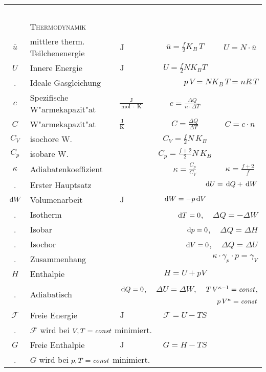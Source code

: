 \begin{landscape}
\begin{longtable}{c l l c c}
%
\hline
~ \\
%
%
%
~ & \textsc{Thermodynamik}\\
$\bar u$ & mittlere therm. Teilchenenergie & $\operatorname{J}$ &
$\bar u = \frac{f}{2} K_B \, T$ & $U = N \cdot \bar u$\\
$U$ & Innere Energie & $\operatorname{J}$ & $U = \frac{f}{2} N K_B
T$\\
. & Ideale Gasgleichung & \multicolumn{3}{r}{$p\,V = N K_B \,T = n R
  \, T$}\\
$c$ & Spezifische W"armekapazit"at &
$\frac{\operatorname{J}}{\operatorname{mol}\cdot \operatorname{K}}$ &
$c = \frac{\Delta Q}{n \cdot \Delta T}$\\
$C$ & W"armekapazit"at & $\frac{\operatorname{J}}{\operatorname{K}}$ &
$C = \frac{\Delta Q}{\Delta T}$ & $C = c \cdot n$\\
$C_V$ & isochore W. & ~ & $C_V = \frac{f}{2} N\, K_B$\\
$C_p$ & isobare W. & ~ & $C_p = \frac{f+2}{2} N\, K_B$\\
$\kappa$ & Adiabatenkoeffizient & ~ & $\kappa = \frac{C_p}{C_V}$ &
$\kappa = \frac{f+2}{f}$\\
. & Erster Hauptsatz & \multicolumn{3}{r}{$\, \mathrm{d} U = \, \mathrm{d} Q + \, \mathrm{d} W$}\\
$\, \mathrm{d} W$ & Volumenarbeit & $\operatorname{J}$ & $\, \mathrm{d} W = - p \, \mathrm{d}
V$\\
. & Isotherm & \multicolumn{3}{r}{$\, \mathrm{d} T = 0$, ~ $\Delta Q = - \Delta
  W$}\\
. & Isobar & \multicolumn{3}{r}{$\, \mathrm{d} p = 0$, ~ $\Delta Q = \Delta
  H$}\\
. & Isochor & \multicolumn{3}{r}{$\, \mathrm{d} V = 0$, ~ $\Delta Q = \Delta
  U$}\\
. & Zusammenhang & \multicolumn{3}{r}{$\kappa \cdot \gamma_p \cdot p = \gamma_V$}\\
$H$ & Enthalpie & ~ & $H = U + pV$\\
. & Adiabatisch & \multicolumn{3}{r}{$\, \mathrm{d} Q = 0$, ~ $\Delta U = \Delta
  W$, ~ $T\,V^{\kappa-1}=\text{\emph{const}}$, ~ $p\, V^\kappa = \text{\emph{const}}$}\\
$\mathcal F$ & Freie Energie & $\operatorname{J}$ & $\mathcal F = U -
TS$\\
. & \multicolumn{4}{l}{$\mathcal F$ wird bei $V, T = \text{\emph{const}}$ minimiert.}\\
$G$ & Freie Enthalpie & $\operatorname{J}$ & $G = H - TS$\\
. & \multicolumn{4}{l}{$G$ wird bei $p, T = \text{\emph{const}}$ minimiert.}\\

\end{longtable}
\end{landscape}
